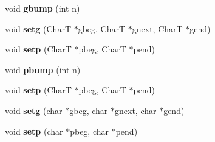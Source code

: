 \begin{DoxyCompactItemize}
void {\bfseries gbump} (int n)
\item 
\mbox{\label{structtest_a6e4a956b7c86c4ff3cc80a768ea41215}} 
void {\bfseries setg} (CharT $\ast$gbeg, CharT $\ast$gnext, CharT $\ast$gend)
\item 
\mbox{\label{structtest_a7d348d4742b2946fc916dfd8c7ce9769}} 
void {\bfseries setp} (CharT $\ast$pbeg, CharT $\ast$pend)
\item 
\mbox{\label{structtest_a70ef8f664d60ddc2889bbf71f2435ce5}} 
void {\bfseries pbump} (int n)
\item 
\mbox{\label{structtest_a7d348d4742b2946fc916dfd8c7ce9769}} 
void {\bfseries setp} (CharT $\ast$pbeg, CharT $\ast$pend)
\item 
\mbox{\label{structtest_a5dfe7aaf6d7d82da553ba8f0abfbea97}} 
void {\bfseries setg} (char $\ast$gbeg, char $\ast$gnext, char $\ast$gend)
\item 
\mbox{\label{structtest_a76a41b9e58b089656eaac664c44b35be}} 
void {\bfseries setp} (char $\ast$pbeg, char $\ast$pend)
\end{DoxyCompactItemize}
